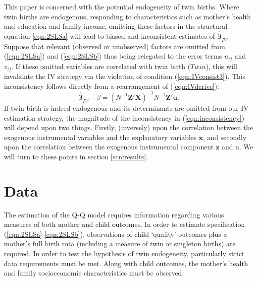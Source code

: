 \documentclass{article}[11pt,subeqn]
\newcommand{\vect}[1]{\mathbf{#1}}
\begin{document}
\begin{spacing}{1.25}
This paper is concerned 
with the potential endogeneity of twin births.  Where twin births are endogenous, responding to characteristics such as mother's 
health and education and family income, omitting these factors in the structural equation \ref{eqn:2SLSa} will lead to biased and 
inconsistent estimates of $\vect{\hat{\beta}}_{IV}$.  Suppose that relevant (observed or unobserved) factors are omitted from
(\ref{eqn:2SLSa}) and (\ref{eqn:2SLSb}) thus being relegated to the error terms $u_{ij}$ and $v_{ij}$.  If these omitted variables 
are correlated with twin birth ($Twin$), this will invalidate the IV strategy via the violation of condition (\ref{eqn:IVconsist3}).  This
inconsistency follows directly from a rearrangement of (\ref{eqn:IVderive}):
\begin{equation}
\label{eqn:inconsistency}
\vect{\hat{\beta}}_{IV}-\beta=(N^{-1}\vect{Z}'\vect{X})^{-1}N^{-1}\vect{Z}'\vect{u}.
\end{equation}
If twin birth is indeed endogenous and its determinants are omitted from our IV estimation strategy, the magnitude of the inconsistency in 
(\ref{eqn:inconsistency}) will depend upon two things.  Firstly, (inversely) upon the correlation between the exogenous instrumental
variables and the explanatory variables $\vect{x}$, and secondly upon the correlation between the exogenous instrumental component
$\vect{z}$ and u.  We will turn to these points in section \ref{scn:results}.

\section{Data}
\label{scn:data}
\vspace{-5mm}
The estimation of the Q-Q model requires information regarding various measures of both mother and child outcomes. In order to estimate 
specification (\ref{eqn:2SLSa}-\ref{eqn:2SLSb}), observations of child `quality' outcomes plus a mother's full birth rota (including a 
measure of twin or singleton births) are required.  In order to test the hypothesis of twin endogeneity, particularly strict data requirements 
must be met.  Along with child outcomes, the mother's health and family socioeconomic characteristics must be observed.


\end{spacing}
\end{document}
